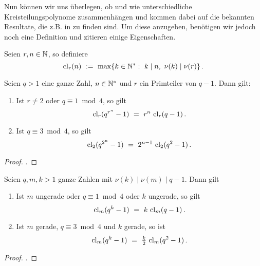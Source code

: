 Nun können wir uns überlegen, ob und wie unterschiedliche Kreisteilungspolynome
zusammenhängen und kommen dabei auf die bekannten Resultate, die z.B. in 
\autocite[Proposition 10.6, 10.7]{hachenberger1997finite} zu finden sind. Um
diese anzugeben, benötigen wir jedoch noch eine Definition und zitieren
einige Eigenschaften.

\begin{definition}
  Seien $r,n\in \mathbb{N}$, so definiere
  \[ \operatorname{cl}_r(n) \ :=\  \max\{k \in \mathbb{N}^\ast:\ k \mid n,\ \nu(k) \mid \nu(r)
  \}\,.\]
\end{definition}


\begin{lemma}
  \label{lemma:cl_1}
  Seien $q>1$ eine ganze Zahl, $n\in \mathbb{N}^\ast$ und $r$ ein Primteiler von $q-1$.
  Dann gilt:
  \begin{enumerate}
    \item Ist $r\neq 2$ oder $q\equiv 1 \bmod 4$, so gilt
      \[ \operatorname{cl}_r(q^{r^n}-1) \ =\  r^n\, \operatorname{cl}_r(q-1) \,.\]
    \item Ist $q \equiv 3 \bmod 4$, so gilt
      \[ \operatorname{cl}_2(q^{2^n}-1) \ =\  2^{n-1}\, \operatorname{cl}_2(q^2-1)\,.\]
  \end{enumerate}
\end{lemma}
\begin{proof}
  \autocite[Lemma 19.4]{hachenberger1997finite}.
\end{proof}


\begin{lemma}
  \label{lemma:cl_2}
  Seien $q,m,k > 1$ ganze Zahlen mit $\nu(k) \mid \nu(m)\mid q-1$. Dann gilt
  \begin{enumerate}
    \item Ist $m$ ungerade oder $q \equiv 1 \bmod 4$ oder $k$ ungerade, so
      gilt
      \[ \operatorname{cl}_m(q^k-1) \ =\  k\,\operatorname{cl}_m(q-1)\,. \]
    \item Ist $m$ gerade, $q \equiv 3 \bmod 4$ und $k$ gerade, so ist
      \[ \operatorname{cl}_m(q^k-1) \ =\  \tfrac k 2\, \operatorname{cl}_m(q^2-1)\,.\]
  \end{enumerate}
\end{lemma}
\begin{proof}
  \autocite[Lemma 19.5]{hachenberger1997finite}.
\end{proof}


